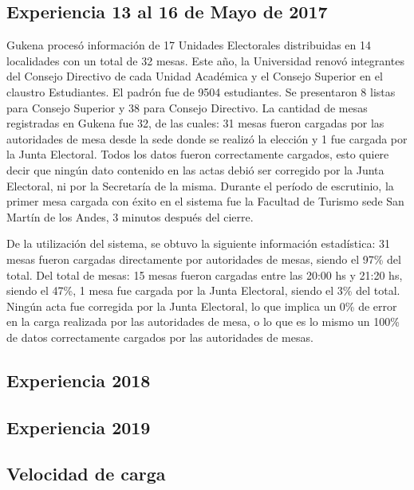 \subsection{Experiencia 13 al 16 de Mayo de 2017}
Gukena procesó información de 17 Unidades Electorales distribuidas en 14 localidades con un total de 32 mesas.
Este año, la Universidad renovó integrantes del Consejo Directivo de cada Unidad Académica y el Consejo Superior en el claustro Estudiantes.
El padrón fue de 9504 estudiantes.  Se presentaron 8 listas para Consejo Superior y 38  para Consejo Directivo.
La cantidad de mesas registradas en Gukena fue 32, de las cuales: 	
31 mesas fueron cargadas por las autoridades de mesa desde la sede donde se realizó la elección y 1 fue cargada por la Junta Electoral. Todos los datos fueron correctamente cargados, esto quiere decir que ningún dato contenido en las actas debió ser corregido por la Junta Electoral, ni por la Secretaría de la misma.
Durante el período de escrutinio, la primer mesa cargada con éxito en el sistema fue la Facultad de Turismo sede San Martín de los Andes, 3 minutos después del cierre.

De la utilización del sistema, se obtuvo la siguiente información estadística:
31 mesas fueron cargadas directamente por autoridades de mesas, siendo el 97\% del total. Del total de mesas:
15 mesas fueron cargadas entre las 20:00 hs y 21:20 hs, siendo el 47\%,
1 mesa fue cargada 	por la Junta Electoral, siendo el 3\% del total.	
Ningún acta fue corregida por la Junta Electoral, lo que implica un 0\% de error en la carga realizada por las autoridades de mesa, o lo que es lo 	mismo un 100\% de datos correctamente cargados por las autoridades de mesas.

\subsection{Experiencia 2018}
\subsection{Experiencia 2019}

\subsection{Velocidad de carga}